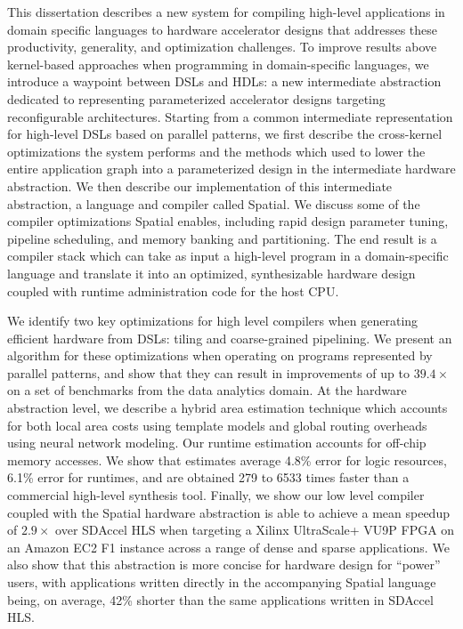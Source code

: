 This dissertation describes a new system for compiling high-level applications
in domain specific languages to
hardware accelerator designs that addresses these productivity, generality,
and optimization challenges. To improve results above kernel-based
approaches when programming in domain-specific languages, we
introduce a waypoint between DSLs and HDLs: a new intermediate abstraction
dedicated to representing parameterized accelerator designs
targeting reconfigurable architectures.
Starting from a common intermediate
representation for high-level DSLs based on parallel patterns, we first describe
the cross-kernel optimizations the system performs and the methods which used to
lower the entire application graph into a parameterized design in the
intermediate hardware abstraction.
We then describe our implementation of
this intermediate abstraction, a language and compiler called Spatial.
We discuss some of the compiler optimizations Spatial enables,
including rapid design parameter tuning, pipeline scheduling, and
memory banking and partitioning.
The end result is a compiler stack which can take as input a high-level program in a domain-specific
language and translate it into an optimized, synthesizable hardware design coupled with
runtime administration code for the host CPU.

We identify two key optimizations for high level compilers when
generating efficient hardware from DSLs: tiling and coarse-grained pipelining.
We present an algorithm for these optimizations when operating on programs represented
by parallel patterns, and show that they can result in improvements of up to
$39.4\times$ on a set of benchmarks from the data analytics domain.
At the hardware abstraction level, we describe a hybrid area estimation
technique which accounts for both local area costs using template models
and global routing overheads using neural network modeling.
Our runtime estimation accounts for off-chip memory accesses.
We show that estimates average 4.8\% error for logic resources,
6.1\% error for runtimes, and are obtained 279 to 6533 times faster
than a commercial high-level synthesis tool.
Finally, we show our low level compiler coupled with the Spatial hardware abstraction is
able to achieve a mean speedup of $2.9\times$ over SDAccel HLS when targeting a
Xilinx UltraScale+ VU9P FPGA on an Amazon EC2 F1 instance across a range of
dense and sparse applications.
We also show that this abstraction is more concise for hardware design for
``power'' users, with applications written directly in the
accompanying Spatial language being, on average, 42\% shorter than the
same applications written in SDAccel HLS.

